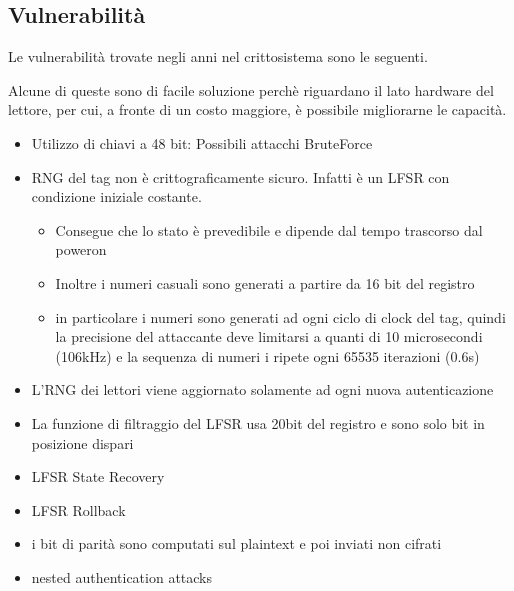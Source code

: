 \subsection{Vulnerabilità}

\begin{frame}
    Le vulnerabilità trovate negli anni nel crittosistema sono le seguenti.

    Alcune di queste sono di facile soluzione perchè riguardano il lato hardware del lettore,
    per cui, a fronte di un costo maggiore, è possibile migliorarne le capacità.
\end{frame}

\begin{frame}
    \scriptsize
    \begin{itemize}
        \item <1-> Utilizzo di chiavi a 48 bit: Possibili attacchi BruteForce \cite{courtois2008algebraic}
        \item <2-> RNG del tag non è crittograficamente sicuro. Infatti è un LFSR con condizione iniziale costante.
        \begin{itemize} \scriptsize
            \item <3-> Consegue che lo stato è prevedibile e dipende dal tempo trascorso dal poweron~\cite{garcia2008dismantling}\cite{courtois2008algebraic}
            \item <4-> Inoltre i numeri casuali sono generati a partire da 16 bit del registro 
            \item <5-> in particolare i numeri sono generati ad ogni ciclo di clock del tag, quindi la precisione del attaccante deve limitarsi a quanti di 10 microsecondi (106kHz) e la sequenza di numeri i ripete ogni 65535 iterazioni (0.6s)
        \end{itemize}
        \item <6-> L'RNG dei lettori viene aggiornato solamente ad ogni nuova autenticazione~\cite{garcia2008dismantling}
        \item <7-> La funzione di filtraggio del LFSR usa 20bit del registro e sono solo bit in posizione dispari
        \item <8-> LFSR State Recovery
        \item <9-> LFSR Rollback
        \item <10-> i bit di parità sono computati sul plaintext e poi inviati non cifrati
        \item <11-> nested authentication attacks
    \end{itemize}
\end{frame}


